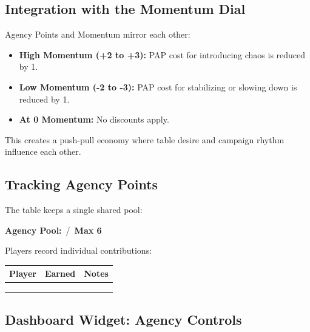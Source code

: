 \documentclass[11pt]{article}
\begin{document}
\subsection{Integration with the Momentum Dial}
Agency Points and Momentum mirror each other:

\begin{itemize}
    \item \textbf{High Momentum (+2 to +3):} PAP cost for introducing chaos is reduced by 1.
    \item \textbf{Low Momentum (-2 to -3):} PAP cost for stabilizing or slowing down is 
    reduced by 1.
    \item \textbf{At 0 Momentum:} No discounts apply.
\end{itemize}

This creates a push-pull economy where table desire and campaign rhythm influence each 
other.

\subsection{Tracking Agency Points}
The table keeps a single shared pool:

\begin{center}
\textbf{Agency Pool:} \underline{\phantom{XX}} \,/\, \textbf{Max 6}
\end{center}

Players record individual contributions:
\begin{center}
\begin{longtable}{|p{3cm}|p{3cm}|p{6cm}|}
\hline
\textbf{Player} & \textbf{Earned} & \textbf{Notes} \\
\hline
 & & \\
 & & \\
 & & \\
\hline
\end{longtable}
\end{center}

\subsection{Dashboard Widget: Agency Controls}
\end{document}
